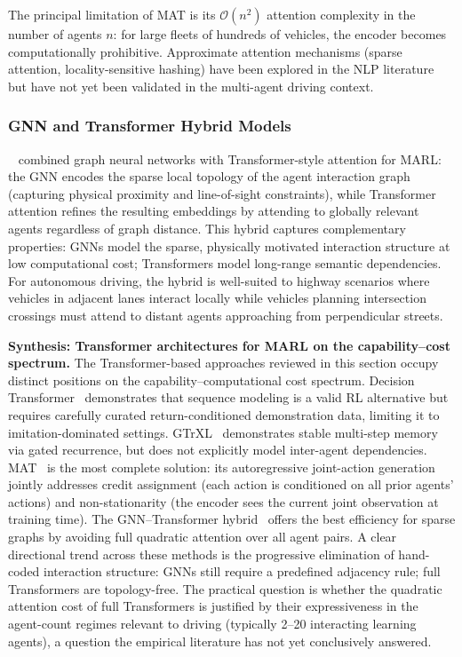 \documentclass[12pt, a4paper]{article}
\begin{document}
The principal limitation of MAT is its $\mathcal{O}(n^2)$ attention
complexity in the number of agents $n$: for large fleets of hundreds of
vehicles, the encoder becomes computationally prohibitive.  Approximate
attention mechanisms (sparse attention, locality-sensitive hashing) have
been explored in the NLP literature but have not yet been validated in the
multi-agent driving context.

\subsubsection{GNN and Transformer Hybrid Models}

\citeauthor{li2020deep}~\cite{li2020deep} combined graph neural networks
with Transformer-style attention for MARL: the GNN encodes the sparse local
topology of the agent interaction graph (capturing physical proximity and
line-of-sight constraints), while Transformer attention refines the
resulting embeddings by attending to globally relevant agents regardless
of graph distance.  This hybrid captures complementary properties: GNNs
model the sparse, physically motivated interaction structure at low
computational cost; Transformers model long-range semantic dependencies.
For autonomous driving, the hybrid is well-suited to highway scenarios where
vehicles in adjacent lanes interact locally while vehicles planning intersection
crossings must attend to distant agents approaching from perpendicular streets.

\smallskip\noindent\textbf{Synthesis: Transformer architectures for MARL on the capability--cost spectrum.}
The Transformer-based approaches reviewed in this section occupy distinct
positions on the capability--computational cost spectrum.
Decision Transformer~\cite{chen2021decision} demonstrates that sequence
modeling is a valid RL alternative but requires carefully curated return-conditioned
demonstration data, limiting it to imitation-dominated settings.
GTrXL~\cite{parisotto2020stabilizing} demonstrates stable multi-step memory
via gated recurrence, but does not explicitly model inter-agent dependencies.
MAT~\cite{wen2022multi} is the most complete solution: its autoregressive
joint-action generation jointly addresses credit assignment (each action is
conditioned on all prior agents' actions) and non-stationarity (the encoder
sees the current joint observation at training time).  The GNN--Transformer
hybrid~\cite{li2020deep} offers the best efficiency for sparse graphs by
avoiding full quadratic attention over all agent pairs.
A clear directional trend across these methods is the progressive elimination
of hand-coded interaction structure: GNNs still require a predefined
adjacency rule; full Transformers are topology-free.  The practical question
is whether the quadratic attention cost of full Transformers is justified
by their expressiveness in the agent-count regimes relevant to driving
(typically 2--20 interacting learning agents), a question the empirical
literature has not yet conclusively answered.
\end{document}
